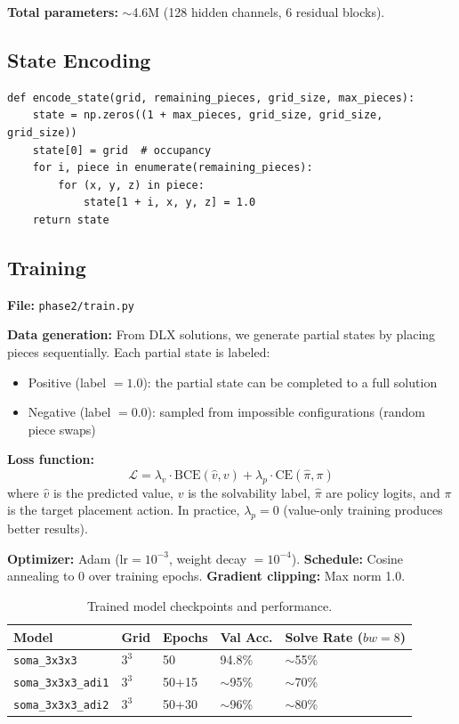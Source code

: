 \documentclass[11pt]{article}
\begin{document}
\textbf{Total parameters:} $\sim$4.6M (128 hidden channels, 6 residual blocks).

\subsection{State Encoding}

\begin{lstlisting}
def encode_state(grid, remaining_pieces, grid_size, max_pieces):
    state = np.zeros((1 + max_pieces, grid_size, grid_size, grid_size))
    state[0] = grid  # occupancy
    for i, piece in enumerate(remaining_pieces):
        for (x, y, z) in piece:
            state[1 + i, x, y, z] = 1.0
    return state
\end{lstlisting}

\subsection{Training}

\textbf{File:} \texttt{phase2/train.py}

\textbf{Data generation:} From DLX solutions, we generate partial states by placing pieces sequentially. Each partial state is labeled:
\begin{itemize}[nosep]
  \item Positive (label $= 1.0$): the partial state can be completed to a full solution
  \item Negative (label $= 0.0$): sampled from impossible configurations (random piece swaps)
\end{itemize}

\textbf{Loss function:}
\[
\mathcal{L} = \lambda_v \cdot \text{BCE}(\hat{v}, v) + \lambda_p \cdot \text{CE}(\hat{\pi}, \pi)
\]
where $\hat{v}$ is the predicted value, $v$ is the solvability label, $\hat{\pi}$ are policy logits, and $\pi$ is the target placement action. In practice, $\lambda_p = 0$ (value-only training produces better results).

\textbf{Optimizer:} Adam ($\text{lr} = 10^{-3}$, weight decay $= 10^{-4}$).
\textbf{Schedule:} Cosine annealing to 0 over training epochs.
\textbf{Gradient clipping:} Max norm 1.0.

\begin{table}[H]
\centering
\begin{tabular}{@{}lllll@{}}
\toprule
\textbf{Model} & \textbf{Grid} & \textbf{Epochs} & \textbf{Val Acc.} & \textbf{Solve Rate ($bw{=}8$)} \\
\midrule
\texttt{soma\_3x3x3} & $3^3$ & 50 & 94.8\% & $\sim$55\% \\
\texttt{soma\_3x3x3\_adi1} & $3^3$ & 50+15 & $\sim$95\% & $\sim$70\% \\
\texttt{soma\_3x3x3\_adi2} & $3^3$ & 50+30 & $\sim$96\% & $\sim$80\% \\
\bottomrule
\end{tabular}
\caption{Trained model checkpoints and performance.}
\end{table}
\end{document}
